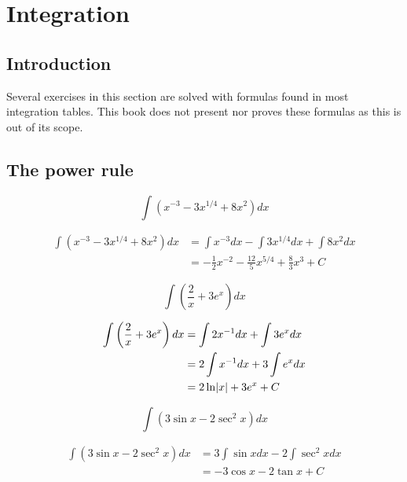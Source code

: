 \documentclass[a4paper, titlepage]{article}
\begin{document}
\section{Integration}

\subsection{Introduction}

Several exercises in this section are solved with formulas found in most
integration tables. This book does not present nor proves these formulas as this
is out of its scope.

\subsection{The power rule}

\begin{Exercise}
\[\int \left( x^{-3} - 3x^{1/4} + 8x^2 \right) dx\]
\cite{anton-bivens-davis}
\end{Exercise}

\begin{Answer}
\begin{align*}
\int \left( x^{-3} - 3x^{1/4} + 8x^2 \right) dx
&= \int x^{-3} dx - \int 3x^{1/4} dx + \int 8x^2 dx \\
&= - \frac{1}{2}x^{-2} - \frac{12}{5}x^{5/4} + \frac{8}{3}x^3 + C
\end{align*}
\end{Answer}

\begin{Exercise}
\[\int \left( \frac{2}{x} + 3e^x \right) dx\]
\cite{anton-bivens-davis}
\end{Exercise}

\begin{Answer}
\begin{align*}
\int \left( \frac{2}{x} + 3e^x \right) dx
&= \int 2x^{-1} dx + \int 3e^x dx \\
&= 2 \int x^{-1} dx + 3 \int e^x dx \\
&= 2 \ln \abs{x} + 3 e^x + C
\end{align*}
\end{Answer}

\begin{Exercise}
\[\int \left( 3 \sin x - 2 \sec^2 x \right) dx\]
\cite{anton-bivens-davis}
\end{Exercise}

\begin{Answer}
\begin{align*}
\int \left( 3 \sin x - 2 \sec^2 x \right) dx
&= 3 \int \sin x dx - 2 \int \sec^2 x dx \\
&= - 3 \cos x - 2 \tan x + C
\end{align*}
\end{Answer}
\end{document}
